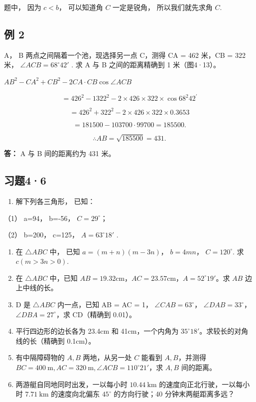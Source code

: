 题中， 因为 \(c < b\)， 可以知道角 \(C\) 一定是锐角， 所以我们就先求角
\(C\).

\subsection{例 2}

A， B 两点之间隔着一个池，现选择另一点 C，测得 CA = 462 米，CB = 322
米， \(\angle ACB = 68^{\circ}42'\) . 求 A 与 B 之间的距离精确到 1
米（图4·13）。

\(AB^{2} - CA^{2} + CB^{2} - 2CA\cdot CB\cos \angle ACB\)

\[
= 426 ^ {2} - 1322 ^ {2} - 2 \times 426 \times 322 \times \cos 68 ^ {2} 42 ^{\prime}
\]

\[
= 426 ^ {2} + 322 ^ {2} - 2 \times 426 \times 322 \times 0.3653
\]

\[
= 181500 - 103700 \cdot 99700 = 185500.
\]

\[
\therefore A B = \sqrt {185500} = 431.
\]

\textbf{答：} A 与 B 间的距离约为 431 米。

\subsection{习题4·6}

\begin{enumerate}
\item
  解下列各三角形， 已知：
\end{enumerate}

（1） a=94， b=-56， \(C=29^{\circ}\)；

（2） b=200， c=125， \(A=63^{\circ}18'\) .

\begin{enumerate}[start=2]
\item
  在 \(\triangle ABC\) 中， 已知 \(a = (m + n)(m - 3n)\)， \(b = 4mn\)，
  \(C = 120^\circ\). 求 \(c(m > 3n > 0)\).
\item
  在 \(\triangle ABC\) 中，已知
  \(AB = 19.32\mathrm{cm}\)，\(AC = 23.57\mathrm{cm}\)，\(A = 52^{\circ}19'\)。求
  \(AB\) 边上中线的长。
\item
  D 是 \(\triangle ABC\) 内一点，已知 AB = AC = 1，
  \(\angle CAB = 63^{\circ}\)， \(\angle DAB = 33^{\circ}\)，
  \(\angle DBA = 27^{\circ}\)，求 CD（精确到 0.01）。
\item
  平行四边形的边长各为 23.4cm 和 41cm，一个内角为
  \(35^{\circ}18'\)。求较长的对角线的长（精确到 0.1cm）。
\item
  有中隔障碍物的 \(A, B\) 两地，从另一处 \(C\) 能看到 \(A, B\)，并测得
  \(BC = 400 \mathrm{~m}, AC = 320 \mathrm{~m}, \angle ACB = 110^{\circ}21'\)，求
  \(A, B\) 间的距离。
\item
  两游艇自同地同时出发，一以每小时 \(10.44 \mathrm{~km}\)
  的速度向正北行驶，一以每小时 \(7.71 \mathrm{~km}\) 的速度向北偏东
  \(45^{\circ}\) 的方向行驶；40 分钟末两艇距离多远？
\end{enumerate}

